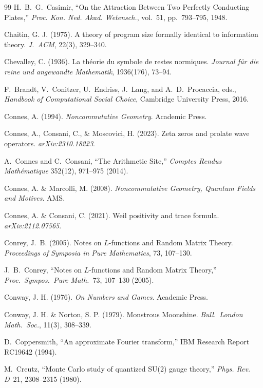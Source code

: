 \begin{thebibliography}{99}
H.~B.~G.~Casimir,
``On the Attraction Between Two Perfectly Conducting Plates,''
\emph{Proc. Kon. Ned. Akad. Wetensch.}, vol.~51, pp.~793--795, 1948.

 Chaitin, G. J. (1975). A theory of program size formally identical to information theory. \emph{J.\ ACM}, 22(3), 329--340.

 Chevalley, C. (1936). La th\'eorie du symbole de restes normiques. \emph{Journal f\"ur die reine und angewandte Mathematik}, 1936(176), 73--94.

F.~Brandt, V.~Conitzer, U.~Endriss, J.~Lang, and A.~D.~Procaccia, eds.,
\emph{Handbook of Computational Social Choice},
Cambridge University Press, 2016.

 Connes, A. (1994). \emph{Noncommutative Geometry}. Academic Press.

 Connes, A., Consani, C., \& Moscovici, H. (2023). Zeta zeros and prolate wave operators. \emph{arXiv:2310.18223}.

A.~Connes and C.~Consani,
``The Arithmetic Site,''
\emph{Comptes Rendus Math\'ematique} 352(12), 971--975 (2014).

 Connes, A. \& Marcolli, M. (2008). \emph{Noncommutative Geometry, Quantum Fields and Motives}. AMS.

 Connes, A. \& Consani, C. (2021). Weil positivity and trace formula. \emph{arXiv:2112.07565}.

Conrey, J.~B. (2005).
Notes on $L$-functions and Random Matrix Theory.
\emph{Proceedings of Symposia in Pure Mathematics}, 73, 107--130.

 J.~B.~Conrey, ``Notes on $L$-functions and Random Matrix Theory,'' \emph{Proc.\ Sympos.\ Pure Math.}\ 73, 107--130 (2005).

 Conway, J. H. (1976). \emph{On Numbers and Games}. Academic Press.

 Conway, J. H. \& Norton, S. P. (1979). Monstrous Moonshine. \emph{Bull.\ London Math.\ Soc.}, 11(3), 308--339.

D.~Coppersmith,
``An approximate Fourier transform,''
IBM Research Report RC19642 (1994).

M.~Creutz,
``Monte Carlo study of quantized SU(2) gauge theory,''
\emph{Phys. Rev. D}\ 21, 2308--2315 (1980).


\end{thebibliography}
